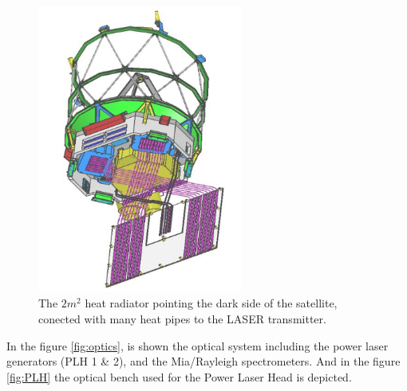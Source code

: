 \begin{figure}[h]
	\centering
	\includegraphics[width=0.6\textwidth]{img/radiator.png}
	\caption[ALADIN thermal control]{The $2m^2$ heat radiator pointing the
	dark side of the satellite, conected with many heat pipes to the LASER
	transmitter. \cite{Endemann2004}}
	\label{fig:radiator}
\end{figure}

In the figure \ref{fig:optics}, is shown the optical system including the power
laser generators (PLH 1 \& 2), and the Mia/Rayleigh spectrometers. And in the figure
\ref{fig:PLH} the optical bench used for the Power Laser Head is depicted.\\

